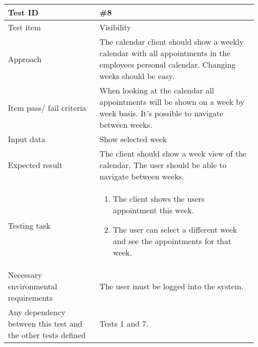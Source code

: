 \documentclass[a4paper, 10pt]{article}
\begin{document}
\begin{tabularx}{\textwidth}{ |X|X| }
\hline
\rowcolor{Gray}
Test ID & \#8 \\ \hline
Test item & Visibility \\ \hline
Approach & The calendar client should show a weekly calendar with all appointments in the employees personal calendar. Changing weeks should be easy. \\ \hline
Item pass/ fail criteria & When looking at the calendar all appointments will be shown on a week by week basis. It's possible to navigate between weeks. \\ \hline
Input data & Show selected week\\ \hline
Expected result & The client should show a week view of the calendar. The user should be able to navigate between weeks. \\ \hline
Testing task &
\begin{enumerate}
    \item The client shows the users appointment this week.
    \item The user can select a different week and see the appointments for that week.
\end{enumerate}
\\ \hline
Necessary environmental requirements & The user must be logged into the system. \\ \hline
Any dependency between this test and the other tests defined & Tests 1 and 7. \\ \hline


\end{tabularx}
\end{document}
